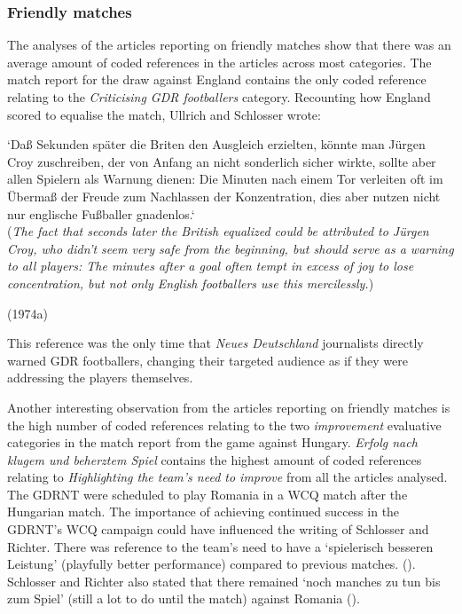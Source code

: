\subsubsection*{Friendly matches}

The analyses of the articles reporting on friendly matches show that there was an average amount of coded references in the articles across most categories. The match report for the draw against England contains the only coded reference relating to the \textit{Criticising GDR footballers} category. Recounting how England scored to equalise the match, Ullrich and Schlosser wrote:

\begin{displayquote}
\begin{small}
‘Daß Sekunden später die Briten den Ausgleich erzielten, könnte man Jürgen Croy zuschreiben, der von Anfang an nicht sonderlich sicher wirkte, sollte aber allen Spielern als Warnung dienen: Die Minuten nach einem Tor verleiten oft im Übermaß der Freude zum Nachlassen der Konzentration, dies aber nutzen nicht nur englische Fußballer gnadenlos.‘\\
(\textit{The fact that seconds later the British equalized could be attributed to Jürgen Croy, who didn't seem very safe from the beginning, but should serve as a warning to all players: The minutes after a goal often tempt in excess of joy to lose concentration, but not only English footballers use this mercilessly.})\
\begin{flushright}\footnotesize (1974a)\end{flushright}
\end{small}
\end{displayquote}

This reference was the only time that \textit{Neues Deutschland} journalists directly warned GDR footballers, changing their targeted audience as if they were addressing the players themselves.

Another interesting observation from the articles reporting on friendly matches is the high number of coded references relating to the two \textit{improvement} evaluative categories in the match report from the game against Hungary. \textit{Erfolg nach klugem und beherztem Spiel} contains the highest amount of coded references relating to \textit{Highlighting the team’s need to improve} from all the articles analysed. The GDRNT were scheduled to play Romania in a WCQ match after the Hungarian match. The importance of achieving continued success in the GDRNT’s WCQ campaign could have influenced the writing of Schlosser and Richter. There was reference to the team’s need to have a ‘spielerisch besseren Leistung’ (playfully better performance) compared to previous matches. (\cite{nd19730517}). Schlosser and Richter also stated that there remained ‘noch manches zu tun bis zum Spiel’ (still a lot to do until the match) against Romania (\cite{nd19730517}).

